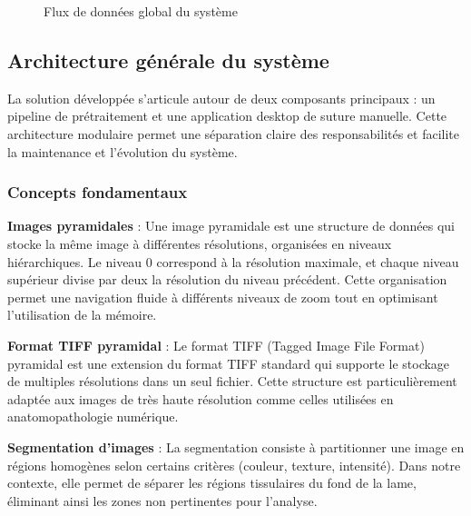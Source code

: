 \documentclass[12pt,a4paper]{report}
\begin{document}
\begin{}
\begin{}
\begin{}
\begin{figure}[H]
\caption{Flux de données global du système}
\end{figure}

\subsection{Architecture générale du système}

La solution développée s'articule autour de deux composants principaux : un pipeline de prétraitement et une application desktop de suture manuelle. Cette architecture modulaire permet une séparation claire des responsabilités et facilite la maintenance et l'évolution du système.

\subsubsection{Concepts fondamentaux}

\textbf{Images pyramidales} : Une image pyramidale est une structure de données qui stocke la même image à différentes résolutions, organisées en niveaux hiérarchiques. Le niveau 0 correspond à la résolution maximale, et chaque niveau supérieur divise par deux la résolution du niveau précédent. Cette organisation permet une navigation fluide à différents niveaux de zoom tout en optimisant l'utilisation de la mémoire.

\textbf{Format TIFF pyramidal} : Le format TIFF (Tagged Image File Format) pyramidal est une extension du format TIFF standard qui supporte le stockage de multiples résolutions dans un seul fichier. Cette structure est particulièrement adaptée aux images de très haute résolution comme celles utilisées en anatomopathologie numérique.

\textbf{Segmentation d'images} : La segmentation consiste à partitionner une image en régions homogènes selon certains critères (couleur, texture, intensité). Dans notre contexte, elle permet de séparer les régions tissulaires du fond de la lame, éliminant ainsi les zones non pertinentes pour l'analyse.


\end{}
\end{}
\end{}
\end{document}
